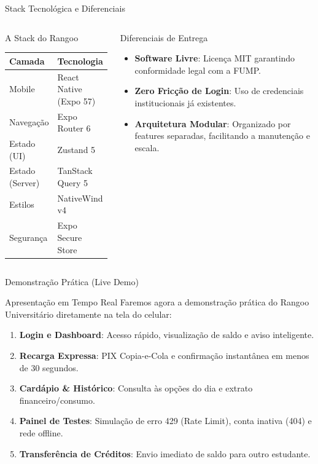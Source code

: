 \documentclass[10pt, aspectratio=169]{beamer}
\begin{document}
\begin{frame}{Stack Tecnológica e Diferenciais}
  \begin{columns}[T,onlytextwidth]
      \begin{block}{A Stack do Rangoo}
        \small
        \begin{tabular}{@{}ll@{}}
          \toprule
          \textbf{Camada} & \textbf{Tecnologia} \\
          \midrule
          Mobile & React Native (Expo 57) \\
          Navegação & Expo Router 6 \\
          Estado (UI) & Zustand 5 \\
          Estado (Server) & TanStack Query 5 \\
          Estilos & NativeWind v4 \\
          Segurança & Expo Secure Store \\
          \bottomrule
        \end{tabular}
      \end{block}

      \begin{exampleblock}{Diferenciais de Entrega}
        \small
        \begin{itemize}
          \item \textbf{Software Livre}: Licença MIT garantindo conformidade legal com a FUMP.
          \item \textbf{Zero Fricção de Login}: Uso de credenciais institucionais já existentes.
          \item \textbf{Arquitetura Modular}: Organizado por features separadas, facilitando a manutenção e escala.
        \end{itemize}
      \end{exampleblock}
  \end{columns}
\end{frame}

\begin{frame}{Demonstração Prática (Live Demo)}
  \begin{block}{Apresentação em Tempo Real}
    \small
    Faremos agora a demonstração prática do Rangoo Universitário diretamente na tela do celular:
    \begin{enumerate}
      \item \textbf{Login e Dashboard}: Acesso rápido, visualização de saldo e aviso inteligente.
      \item \textbf{Recarga Expressa}: PIX Copia-e-Cola e confirmação instantânea em menos de 30 segundos.
      \item \textbf{Cardápio \& Histórico}: Consulta às opções do dia e extrato financeiro/consumo.
      \item \textbf{Painel de Testes}: Simulação de erro 429 (Rate Limit), conta inativa (404) e rede offline.
      \item \textbf{Transferência de Créditos}: Envio imediato de saldo para outro estudante.
    \end{enumerate}
  \end{block}
\end{frame}
\end{document}
